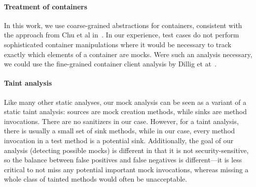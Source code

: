 \paragraph{Treatment of containers} In this work, we use coarse-grained abstractions for containers, consistent with the approach from Chu et al in~\cite{chu12:_collec_disjoin_analy}. In our experience, test cases do not perform sophisticated container manipulations where it would be necessary to track exactly which elements of a container are mocks. Were such an analysis necessary, we could use the fine-grained container client analysis by Dillig et at~\cite{dillig11:_precis_reason_progr_using_contain}.

\paragraph{Taint analysis} Like many other static analyses, our mock analysis can be seen as a variant of a static taint analysis: sources are mock creation methods, while sinks are method invocations. There are no sanitizers in our case. However, for a taint analysis, there is usually a small set of sink methods, while in our case, every method invocation in a test method is a potential sink. Additionally, the goal of our analysis (detecting possible mocks) is different in that it is not security-sensitive, so the balance between false positives and false negatives is different---it is less critical to not miss any potential important mock invocations, whereas missing a whole class of tainted methods would often be unacceptable.



